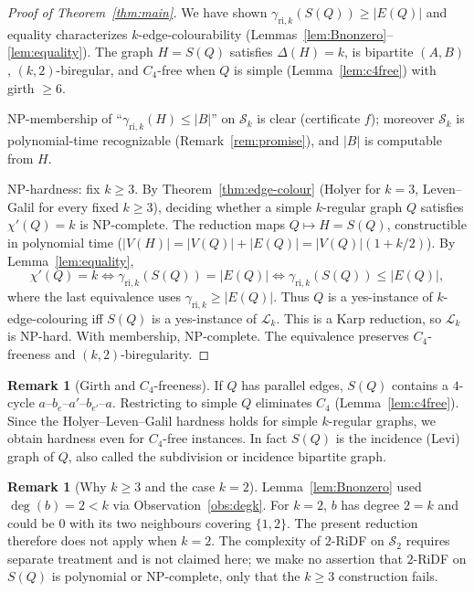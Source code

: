 \documentclass[11pt,a4paper]{article}
\theoremstyle{plain}
\theoremstyle{definition}
\newtheorem{remark}[theorem]{Remark}
\newcommand{\gri}{\gamma_{\mathrm{ri},k}}
\newcommand{\cS}{\mathcal{S}}
\newcommand{\cL}{\mathcal{L}}
\begin{document}
\begin{proof}[Proof of Theorem~\ref{thm:main}]
We have shown $\gri(S(Q))\ge|E(Q)|$ and equality characterizes $k$-edge-colourability (Lemmas~\ref{lem:Bnonzero}--\ref{lem:equality}). The graph $H=S(Q)$ satisfies $\Delta(H)=k$, is bipartite $(A,B)$, $(k,2)$-biregular, and $C_{4}$-free when $Q$ is simple (Lemma~\ref{lem:c4free}) with girth $\ge6$.

NP-membership of ``$\gri(H)\le|B|$'' on $\cS_{k}$ is clear (certificate $f$); moreover $\cS_{k}$ is polynomial-time recognizable (Remark~\ref{rem:promise}), and $|B|$ is computable from $H$.

NP-hardness: fix $k\ge3$. By Theorem~\ref{thm:edge-colour} (Holyer \cite{Holyer1981} for $k=3$, Leven--Galil \cite{LevenGalil1983} for every fixed $k\ge3$), deciding whether a simple $k$-regular graph $Q$ satisfies $\chi'(Q)=k$ is NP-complete. The reduction maps $Q\mapsto H=S(Q)$, constructible in polynomial time ($|V(H)|=|V(Q)|+|E(Q)|=|V(Q)|(1+k/2)$). By Lemma~\ref{lem:equality},
\[
\chi'(Q)=k \iff \gri(S(Q))=|E(Q)| \iff \gri(S(Q))\le|E(Q)|,
\]
where the last equivalence uses $\gri\ge|E(Q)|$.
Thus $Q$ is a yes-instance of $k$-edge-colouring iff $S(Q)$ is a yes-instance of $\cL_{k}$. This is a Karp reduction, so $\cL_{k}$ is NP-hard. With membership, NP-complete. The equivalence preserves $C_{4}$-freeness and $(k,2)$-biregularity.
\end{proof}

\begin{remark}[Girth and $C_{4}$-freeness]
If $Q$ has parallel edges, $S(Q)$ contains a $4$-cycle $a$--$b_{e}$--$a'$--$b_{e'}$--$a$. Restricting to simple $Q$ eliminates $C_{4}$ (Lemma~\ref{lem:c4free}). Since the Holyer--Leven--Galil hardness holds for simple $k$-regular graphs, we obtain hardness even for $C_{4}$-free instances. In fact $S(Q)$ is the incidence (Levi) graph of $Q$, also called the subdivision or incidence bipartite graph.
\end{remark}

\begin{remark}[Why $k\ge3$ and the case $k=2$]\label{rem:k2}
Lemma~\ref{lem:Bnonzero} used $\deg(b)=2<k$ via Observation~\ref{obs:degk}. For $k=2$, $b$ has degree $2=k$ and could be $0$ with its two neighbours covering $\{1,2\}$. The present reduction therefore does not apply when $k=2$. The complexity of $2$-RiDF on $\cS_{2}$ requires separate treatment and is not claimed here; we make no assertion that $2$-RiDF on $S(Q)$ is polynomial or NP-complete, only that the $k\ge3$ construction fails.
\end{remark}
\end{document}
